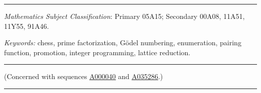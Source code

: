 \documentclass[12pt,reqno]{article}
\newcommand{\seqnum}[1]{\href{https://oeis.org/#1}{\rm \underline{#1}}}
\begin{document}
\bigskip
\hrule
\bigskip

 {\it Mathematics Subject Classification}: Primary 05A15; Secondary 00A08,
11A51, 11Y55, 91A46.

\noindent \emph{Keywords:} chess, prime factorization, G\"odel numbering, enumeration, pairing
function, promotion, integer programming, lattice reduction.

\bigskip
\hrule
\bigskip

\noindent (Concerned with sequences
\seqnum{A000040} and
\seqnum{A035286}.)

\bigskip
\hrule
\bigskip
\end{document}
